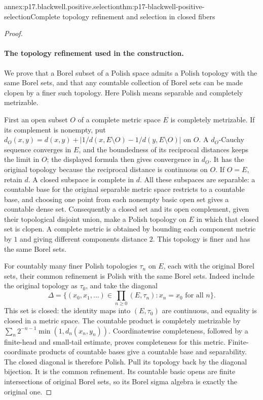 \begin{annexitem}{annex:p17.blackwell.positive.selection}{thm:p17-blackwell-positive-selection}{Complete topology refinement and selection in closed fibers}
\begin{proof}
\paragraph{The topology refinement used in the construction.}
We prove that a Borel subset of a Polish space admits a Polish
topology with the same Borel sets, and that any countable
collection of Borel sets can be made clopen by a finer such
topology. Here Polish means separable and completely metrizable.

First an open subset \(O\) of a complete metric space \(E\)
is completely metrizable. If its complement is nonempty, put
\(d_O(x,y)=d(x,y)+|1/d(x,E\setminus O)-1/d(y,E\setminus O)|\)
on \(O\). A \(d_O\)-Cauchy sequence converges in \(E\), and
the boundedness of its reciprocal distances keeps the limit
in \(O\); the displayed formula then gives convergence in
\(d_O\). It has the original topology because the reciprocal
distance is continuous on \(O\). If \(O=E\), retain \(d\).
A closed subspace is complete in \(d\).
All these subspaces are separable: a countable base for the
original separable metric space restricts to a countable base,
and choosing one point from each nonempty basic open set gives
a countable dense set.
Consequently a closed set and its open complement, given their
topological disjoint union, make a Polish topology on \(E\)
in which that closed set is clopen. A complete metric is obtained
by bounding each component metric by \(1\) and giving different
components distance \(2\). This topology is finer and has the
same Borel sets.

For countably many finer Polish topologies \(\tau_n\) on \(E\),
each with the original Borel sets, their common refinement is
Polish with the same Borel sets. Indeed include the original
topology as \(\tau_0\), and take the diagonal
\[
 \Delta=\{(x_0,x_1,\ldots)\in\prod_{n\geq0}(E,\tau_n):
                                      x_n=x_0\text{ for all }n\}.
\]
This set is closed: the identity maps into \((E,\tau_0)\)
are continuous, and equality is closed in a metric space.
The countable product is completely metrizable by
\(\sum_n2^{-n-1}\min(1,d_n(x_n,y_n))\).
Coordinatewise completeness, followed by a finite-head and
small-tail estimate, proves completeness for this metric.
Finite-coordinate products of countable bases give a countable
base and separability. The closed diagonal is therefore Polish.
Pull its topology back by the diagonal bijection.
It is the common refinement. Its countable basic opens are
finite intersections of original Borel sets, so its Borel
sigma algebra is exactly the original one.


\end{proof}
\end{annexitem}
